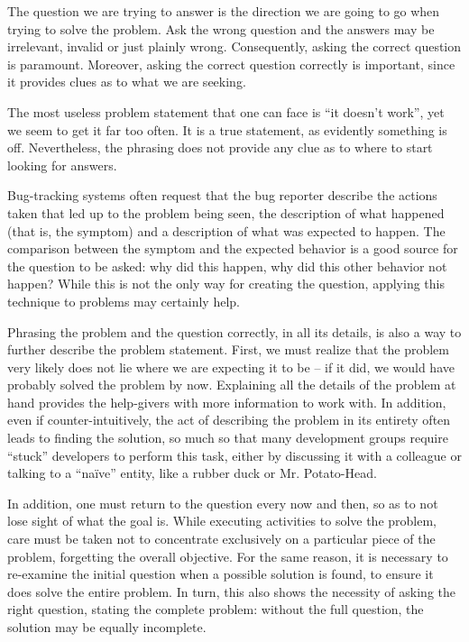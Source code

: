 The question we are trying to answer is the direction we are going to go when
trying to solve the problem. Ask the wrong question and the answers may be
irrelevant, invalid or just plainly wrong. Consequently, asking the correct
question is paramount. Moreover, asking the correct question correctly is
important, since it provides clues as to what we are seeking.

The most useless problem statement that one can face is ``it doesn’t work'', yet
we seem to get it far too often. It is a true statement, as evidently something
is off. Nevertheless, the phrasing does not provide any clue as to where to
start looking for answers.

Bug-tracking systems often request that the bug reporter describe the actions
taken that led up to the problem being seen, the description of what happened
(that is, the symptom) and a description of what was expected to happen. The
comparison between the symptom and the expected behavior is a good source for
the question to be asked: why did this happen, why did this other behavior not
happen? While this is not the only way for creating the question, applying this
technique to problems may certainly help.

Phrasing the problem and the question correctly, in all its details, is also a
way to further describe the problem statement. First, we must realize that the problem very likely does not lie where we are expecting it to be -- if it did, we would have probably solved the problem by now. Explaining all the details of the problem at hand provides the help-givers with more information to work with. In addition, even if counter-intuitively, the act of describing the problem in its entirety often leads to finding the solution, so much so that many development groups require ``stuck'' developers to perform this task, either by discussing it with a colleague or talking to a ``naïve'' entity, like a rubber duck or Mr. Potato-Head.

In addition, one must return to the question every now and then, so as to not
lose sight of what the goal is. While executing activities to solve the problem,
care must be taken not to concentrate exclusively on a particular piece of the
problem, forgetting the overall objective. For the same reason, it is necessary
to re-examine the initial question when a possible solution is found, to ensure
it does solve the entire problem. In turn, this also shows the necessity of
asking the right question, stating the complete problem: without the full
question, the solution may be equally incomplete.

